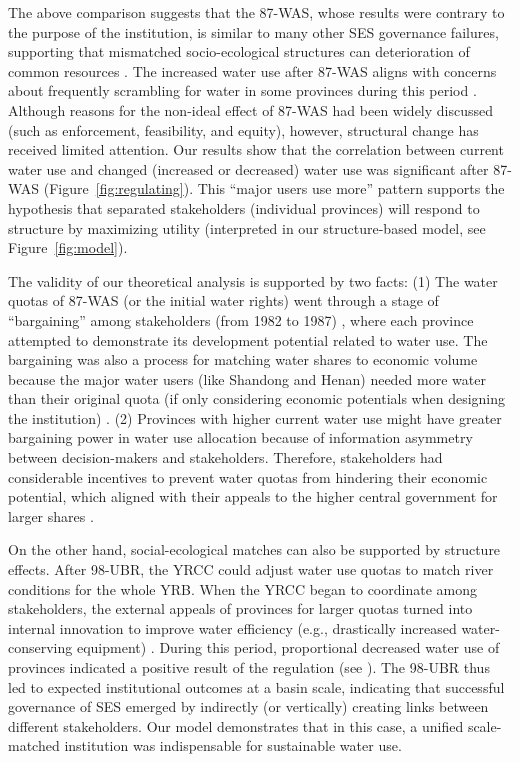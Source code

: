 \documentclass[default, sn-standardnature]{sn-jnl}
\begin{document}
\label{discussion-2}
The above comparison suggests that the 87-WAS, whose results were contrary to the purpose of the institution, is similar to many other SES governance failures, supporting that mismatched socio-ecological structures can deterioration of common resources \cite{kellenberg2009,cai2016,barnes2019}.
The increased water use after 87-WAS aligns with concerns about frequently scrambling for water in some provinces during this period \cite{mao2000, bouckaert2022}.
Although reasons for the non-ideal effect of 87-WAS had been widely discussed \cite{huangang2002} (such as enforcement, feasibility, and equity), however, structural change has received limited attention.
Our results show that the correlation between current water use and changed (increased or decreased) water use was significant after 87-WAS (Figure~\ref{fig:regulating}).
This ``major users use more'' pattern supports the hypothesis that separated stakeholders (individual provinces) will respond to structure by maximizing utility (interpreted in our structure-based model, see Figure~\ref{fig:model}).

The validity of our theoretical analysis is supported by two facts:
(1) The water quotas of 87-WAS (or the initial water rights) went through a stage of ``bargaining'' among stakeholders (from 1982 to 1987) \cite{wang2019a, wang2019d}, where each province attempted to demonstrate its development potential related to water use.
The bargaining was also a process for matching water shares to economic volume because the major water users (like Shandong and Henan) needed more water than their original quota (if only considering economic potentials when designing the institution) \cite{zuo2020}.
(2) Provinces with higher current water use might have greater bargaining power in water use allocation because of information asymmetry between decision-makers and stakeholders.
Therefore, stakeholders had considerable incentives to prevent water quotas from hindering their economic potential, which aligned with their appeals to the higher central government for larger shares \cite{wang2019a, wang2019d}.

\label{discussion-3}
On the other hand, social-ecological matches can also be supported by structure effects.
After 98-UBR, the YRCC could adjust water use quotas to match river conditions for the whole YRB.
When the YRCC began to coordinate among stakeholders, the external appeals of provinces for larger quotas turned into internal innovation to improve water efficiency (e.g., drastically increased water-conserving equipment)
\cite{krieger1955, ostrom1990}.
During this period, proportional decreased water use of provinces indicated a positive result of the regulation (see ).
The 98-UBR thus led to expected institutional outcomes at a basin scale, indicating that successful governance of SES emerged by indirectly (or vertically) creating links between different stakeholders.
Our model demonstrates that in this case, a unified scale-matched institution was indispensable for sustainable water use.
\end{document}
